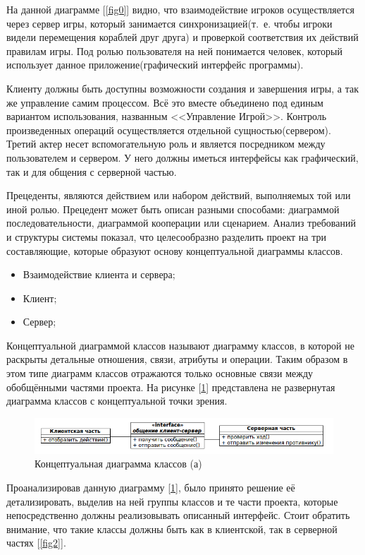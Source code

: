 На данной диаграмме [\ref{fig0}] видно, что взаимодействие игроков осуществляется через сервер игры, который
занимается синхронизацией(т.~е. чтобы игроки видели перемещения кораблей друг друга)
и проверкой соответствия их действий правилам игры. Под ролью пользователя на ней понимается 
человек, который использует данное приложение(графический интерфейс программы).

Клиенту должны быть доступны возможности создания и завершения игры, а так же управление самим процессом. Всё это вместе объединено под единым вариантом использования, названным <<Управление Игрой>>. Контроль произведенных операций осуществляется отдельной сущностью(сервером). Третий актер несет вспомогательную роль и является посредником между пользователем и сервером. У него должны иметься интерфейсы как графический, так и для общения с серверной частью. 

Прецеденты, являются действием или набором действий, выполняемых той или иной ролью. Прецедент может быть описан разными способами: диаграммой последовательности, диаграммой кооперации или сценарием.
Анализ требований и структуры системы показал, что целесообразно разделить проект на три составляющие, которые образуют основу концептуальной диаграммы классов. 
\begin{itemize}
	\item Взаимодействие клиента и сервера; 
	\item Клиент;
	\item Сервер;
\end{itemize} 

Концептуальной диаграммой классов называют диаграмму классов, в которой не раскрыты детальные отношения, связи, атрибуты и операции. Таким образом в этом типе диаграмм классов отражаются только основные связи между обобщёнными частями проекта. На рисунке [\ref{fig1}] представлена не развернутая диаграмма классов с концептуальной точки зрения.
\begin{figure}[ht]
\centering
\includegraphics[width=17cm]{images/class.png}
\caption{Концептуальная диаграмма классов (а)}
\label{fig1}
\end{figure}

Проанализировав данную диаграмму [\ref{fig1}], было принято решение её детализировать, выделив на ней группы классов и те части проекта, которые непосредственно должны реализовывать описанный интерфейс. Стоит обратить внимание, что такие классы должны быть как в клиентской, так в серверной частях [\ref{fig2}].

